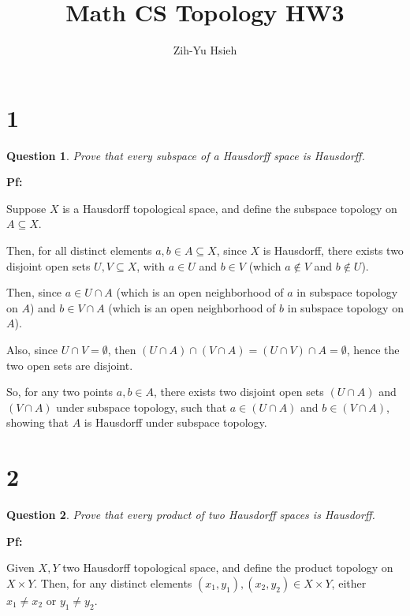 \documentclass{article}
\title{Math CS Topology HW3}
\author{Zih-Yu Hsieh}
\newtheorem{question}{Question}
\begin{document}
\maketitle

\section*{1}
\begin{myBox}[]{}
    \begin{question}
        Prove that every subspace of a Hausdorff space is Hausdorff.
    \end{question}
\end{myBox}

\textbf{Pf:}

Suppose $X$ is a Hausdorff topological space, and define the subspace topology on $A\subseteq X$.

Then, for all distinct elements $a,b\in A\subseteq X$, since $X$ is Hausdorff, there exists two disjoint open sets $U,V\subseteq X$, 
with $a\in U$ and $b\in V$ (which $a\notin V$ and $b\notin U$).

Then, since $a\in U\cap A$ (which is an open neighborhood of $a$ in subspace topology on $A$) and $b\in V\cap A$ (which is an open neighborhood of $b$ in subspace topology on $A$).

Also, since $U\cap V=\emptyset$, then $(U\cap A)\cap (V\cap A)=(U\cap V)\cap A=\emptyset$, hence the two open sets are disjoint.

\hfill

So, for any two points $a,b\in A$, there exists two disjoint open sets $(U\cap A)$ and $(V\cap A)$ under subspace topology,
such that $a\in (U\cap A)$ and $b\in (V\cap A)$, showing that $A$ is Hausdorff under subspace topology.

\hfill

\hfill

\section*{2}
\begin{myBox}[]{}
    \begin{question}
        Prove that every product of two Hausdorff spaces is Hausdorff.
    \end{question}
\end{myBox}

\textbf{Pf:}

Given $X,Y$ two Hausdorff topological space, and define the product topology on $X\times Y$.
Then, for any distinct elements $(x_1,y_1),(x_2,y_2)\in X\times Y$, either $x_1\neq x_2$ or $y_1\neq y_2$.
\end{document}
